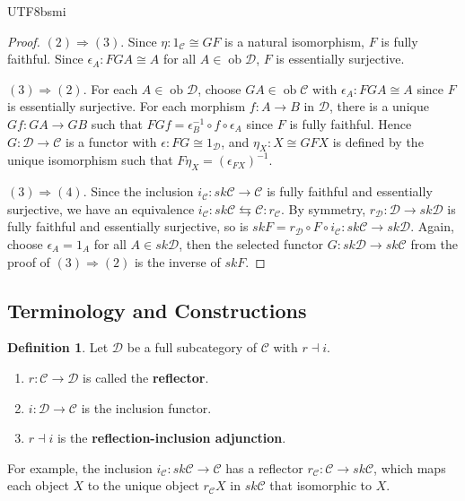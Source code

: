 \documentclass[12pt]{article}
\theoremstyle{definition}
\newtheorem{definition}{Definition}[section]
\newcommand\<{\langle}
\renewcommand\>{\rangle}
\DeclareMathOperator{\ob}{ob}
\begin{document}
\begin{CJK}{UTF8}{bsmi}
\begin{proof}
    $(2)\Rightarrow(3)$.
    Since $\eta:1_\mathcal{C}\cong GF$ is a natural isomorphism, $F$ is fully faithful.
    Since $\epsilon_A:FGA\cong A$ for all $A\in\ob\mathcal{D}$, $F$ is essentially surjective.

    $(3)\Rightarrow(2)$.
    For each $A\in\ob\mathcal{D}$, choose $GA\in\ob\mathcal{C}$ with $\epsilon_A:FGA\cong A$ since $F$ is essentially surjective.
    For each morphism $f:A\to B$ in $\mathcal{D}$, there is a unique $Gf:GA\to GB$ such that $FGf=\epsilon^{-1}_B\circ f\circ\epsilon_A$ since $F$ is fully faithful.
    Hence $G:\mathcal{D}\to\mathcal{C}$ is a functor with $\epsilon:FG\cong1_\mathcal{D}$, and $\eta_X:X\cong GFX$ is defined by the unique isomorphism such that $F\eta_X=(\epsilon_{FX})^{-1}$.

    $(3)\Rightarrow(4)$.
    Since the inclusion $i_\mathcal{C}:sk\mathcal{C}\to\mathcal{C}$ is fully faithful and essentially surjective, we have an equivalence $i_\mathcal{C}:sk\mathcal{C}\leftrightarrows\mathcal{C}:r_\mathcal{C}$.
    By symmetry, $r_\mathcal{D}:\mathcal{D}\to sk\mathcal{D}$ is fully faithful and essentially surjective, so is $skF=r_\mathcal{D}\circ F\circ i_\mathcal{C}:sk\mathcal{C}\to sk\mathcal{D}$.
    Again, choose $\epsilon_A=1_A$ for all $A\in sk\mathcal{D}$, then the selected functor $G:sk\mathcal{D}\to sk\mathcal{C}$ from the proof of $(3)\Rightarrow(2)$ is the inverse of $skF$.
\end{proof}

\subsection{Terminology and Constructions}

\begin{definition}
    Let $\mathcal{D}$ be a full subcategory of $\mathcal{C}$ with $r\dashv i$.
    \begin{enumerate}
        \item $r:\mathcal{C}\to\mathcal{D}$ is called the \textbf{reflector}.
        \item $i:\mathcal{D}\to\mathcal{C}$ is the inclusion functor.
        \item $r\dashv i$ is the \textbf{reflection-inclusion adjunction}.
    \end{enumerate}
\end{definition}

For example, the inclusion $i_\mathcal{C}:sk\mathcal{C}\to\mathcal{C}$ has a reflector $r_\mathcal{C}:\mathcal{C}\to sk\mathcal{C}$, which maps each object $X$ to the unique object $r_\mathcal{C}X$ in $sk\mathcal{C}$ that isomorphic to $X$.


\end{CJK}
\end{document}
